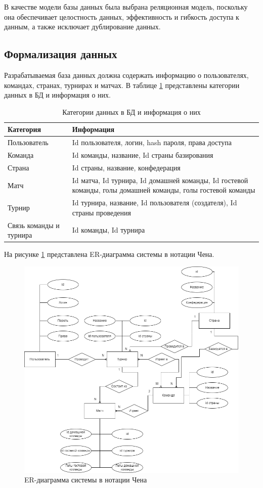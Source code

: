 В качестве модели базы данных была выбрана реляционная модель, поскольку она обеспечивает целостность данных, эффективность и гибкость доступа к данным, а также исключает дублирование данных.

\subsection{Формализация данных}
Разрабатываемая база данных должна содержать информацию о пользователях, командах, странах, турнирах и матчах.
В таблице \ref{info} представлены категории данных в БД и информация о них.

\begin{table}[ht!]
	\centering
	\caption{Категории данных в БД и информация о них}
	\label{info}
	\begin{tabular}{|p{4cm}|p{10cm}|}
			\hline
			\textbf{Категория} & \textbf{Информация}\\
			\hline
			Пользователь & Id пользователя, логин, hash пароля, права доступа \\
			\hline
			Команда & Id команды, название, Id страны базирования \\
			\hline
			Страна & Id страны, название, конфедерация \\
			\hline
            Матч & Id матча, Id турнира, Id домашней команды, Id гостевой команды, голы домашней команды, голы гостевой команды \\
			\hline
            Турнир & Id турнира, название, Id пользователя (создателя), Id страны проведения \\
			\hline
            Связь команды и турнира & Id команды, Id турнира \\
			\hline
	\end{tabular}
\end{table}
\newpage
На рисунке \ref{img:er} представлена ER-диаграмма системы в нотации Чена.
\begin{figure}
  \centering
  \includegraphics[scale=0.5]{inc/er}
  \caption{ER-диаграмма системы в нотации Чена}
  \label{img:er}
\end{figure}

